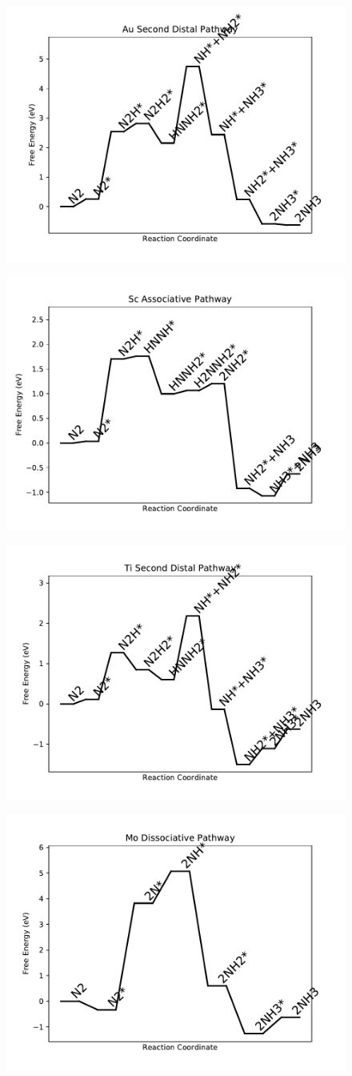 \documentclass[journal=jacsat,manuscript=article]{achemso}
\begin{document}
\begin{figure}
\includegraphics[width=0.5\linewidth]{data/plots/Au_distal_2.pdf}
\label{fig:Au_distal_2}
\end{figure}

\newpage
\begin{figure}
\includegraphics[width=0.5\linewidth]{data/plots/Sc_associative.pdf}
\label{fig:Sc_associative}
\end{figure}

\begin{figure}
\includegraphics[width=0.5\linewidth]{data/plots/Ti_distal_2.pdf}
\label{fig:Ti_distal_2}
\end{figure}

\newpage
\begin{figure}
\includegraphics[width=0.5\linewidth]{data/plots/Mo_dissociative.pdf}
\label{fig:Mo_dissociative}
\end{figure}
\end{document}
